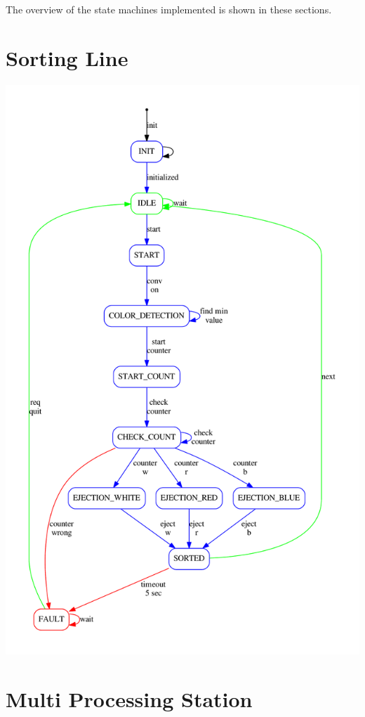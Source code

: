 The overview of the state machines implemented is shown in these sections.\hypertarget{Overview State Machines_SLD}{}\section{Sorting Line}\label{Overview State Machines_SLD}

\begin{DoxyImageNoCaption}
  \mbox{\includegraphics[width=\textwidth,height=\textheight/2,keepaspectratio=true]{dot_TxtSortingLineRun}}
\end{DoxyImageNoCaption}
\hypertarget{Overview State Machines_MPO}{}\section{Multi Processing Station}\label{Overview State Machines_MPO}


